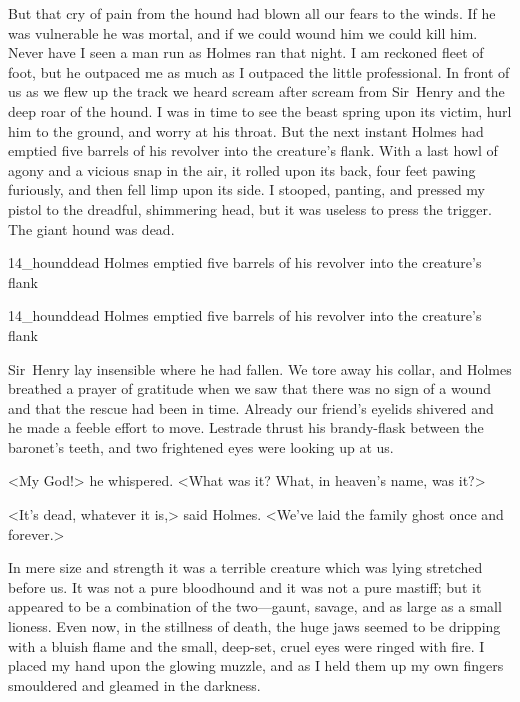 But that cry of pain from the hound had blown all our fears to the winds. If he was vulnerable he was mortal, and if we could wound him we could kill him. Never have I seen a man run as Holmes ran that night. I am reckoned fleet of foot, but he outpaced me as much as I outpaced the little professional. In front of us as we flew up the track we heard scream after scream from Sir~Henry and the deep roar of the hound. I was in time to see the beast spring upon its victim, hurl him to the ground, and worry at his throat. But the next instant Holmes had emptied five barrels of his revolver into the creature's flank. With a last howl of agony and a vicious snap in the air, it rolled upon its back, four feet pawing furiously, and then fell limp upon its side. I stooped, panting, and pressed my pistol to the dreadful, shimmering head, but it was useless to press the trigger. The giant hound was dead.

\begin{letter}
	\begin{bwbigpic}
			[1.0]  
		{14_hounddead}
		{Holmes emptied five barrels of his revolver into the creature's flank}
	\end{bwbigpic}
\end{letter}
\begin{a4}
	\begin{bwbigpic}
		[1.0] 
		{14_hounddead}
		{Holmes emptied five barrels of his revolver into the creature's flank}
	\end{bwbigpic}
\end{a4}

Sir~Henry lay insensible where he had fallen. We tore away his collar, and Holmes breathed a prayer of gratitude when we saw that there was no sign of a wound and that the rescue had been in time. Already our friend's eyelids shivered and he made a feeble effort to move. Lestrade thrust his brandy-flask between the baronet's teeth, and two frightened eyes were looking up at us.

<My God!> he whispered. <What was it? What, in heaven's name, was it?>

<It's dead, whatever it is,> said Holmes. <We've laid the family ghost once and forever.>

In mere size and strength it was a terrible creature which was lying stretched before us. It was not a pure bloodhound and it was not a pure mastiff; but it appeared to be a combination of the two—gaunt, savage, and as large as a small lioness. Even now, in the stillness of death, the huge jaws seemed to be dripping with a bluish flame and the small, deep-set, cruel eyes were ringed with fire. I placed my hand upon the glowing muzzle, and as I held them up my own fingers smouldered and gleamed in the darkness.

